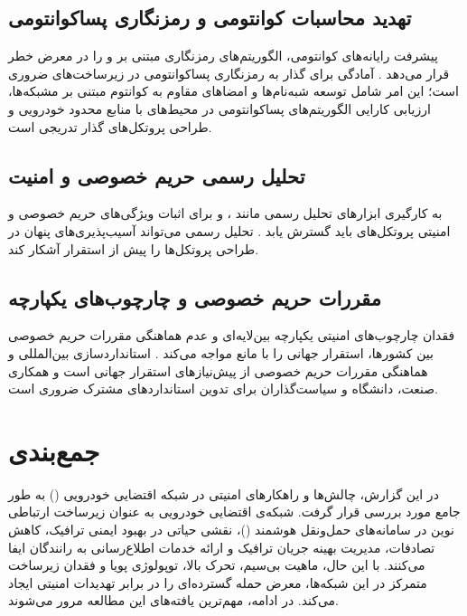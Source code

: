 \documentclass[12pt,a4paper]{article}
\begin{document}
\subsection{تهدید محاسبات کوانتومی و رمزنگاری پساکوانتومی}
پیشرفت رایانه‌های کوانتومی، الگوریتم‌های رمزنگاری مبتنی بر  و  را در معرض خطر قرار می‌دهد \cite{rahmawatiagustinaSystematicLiteratureReview2025}. آمادگی برای گذار به رمزنگاری پساکوانتومی در زیرساخت‌های  ضروری است؛ این امر شامل توسعه شبه‌نام‌ها و امضاهای مقاوم به کوانتوم مبتنی بر مشبکه‌ها، ارزیابی کارایی الگوریتم‌های پساکوانتومی در محیط‌های با منابع محدود خودرویی و طراحی پروتکل‌های گذار تدریجی است.

\subsection{تحلیل رسمی حریم خصوصی و امنیت}
به کارگیری ابزارهای تحلیل رسمی مانند ،  و  برای اثبات ویژگی‌های حریم خصوصی و امنیتی پروتکل‌های  باید گسترش یابد \cite{rahmawatiagustinaSystematicLiteratureReview2025}. تحلیل رسمی می‌تواند آسیب‌پذیری‌های پنهان در طراحی پروتکل‌ها را پیش از استقرار آشکار کند.

\subsection{مقررات حریم خصوصی و چارچوب‌های یکپارچه}
فقدان چارچوب‌های امنیتی یکپارچه بین‌لایه‌ای و عدم هماهنگی مقررات حریم خصوصی بین کشورها، استقرار جهانی  را با مانع مواجه می‌کند \cite{VanetSecurityPrivacy}. استانداردسازی بین‌المللی و هماهنگی مقررات حریم خصوصی از پیش‌نیازهای استقرار جهانی است و همکاری صنعت، دانشگاه و سیاست‌گذاران برای تدوین استانداردهای مشترک ضروری است.

\section{جمع‌بندی}

در این گزارش، چالش‌ها و راهکارهای امنیتی در شبکه اقتضایی خودرویی () به طور جامع مورد بررسی قرار گرفت. شبکه‌ی اقتضایی خودرویی به عنوان زیرساخت ارتباطی نوین در سامانه‌های حمل‌ونقل هوشمند ()، نقشی حیاتی در بهبود ایمنی ترافیک، کاهش تصادفات، مدیریت بهینه جریان ترافیک و ارائه خدمات اطلاع‌رسانی به رانندگان ایفا می‌کنند. با این حال، ماهیت بی‌سیم، تحرک بالا، توپولوژی پویا و فقدان زیرساخت متمرکز در این شبکه‌ها، معرض حمله گسترده‌ای را در برابر تهدیدات امنیتی ایجاد می‌کند. در ادامه، مهم‌ترین یافته‌های این مطالعه مرور می‌شوند.
\end{document}
